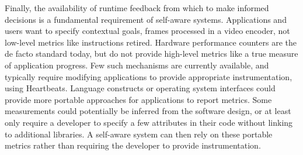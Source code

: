 Finally, the availability of runtime feedback from which to make informed decisions is a fundamental requirement of self-aware systems.
Applications and users want to specify contextual goals, \eg frames processed in a video encoder, not low-level metrics like instructions retired.
Hardware performance counters are the de facto standard today, but do not provide high-level metrics like a true measure of application progress.
Few such mechanisms are currently available, and typically require modifying applications to provide appropriate instrumentation, \eg using Heartbeats.
Language constructs or operating system interfaces could provide more portable approaches for applications to report metrics.
Some measurements could potentially be inferred from the software design, or at least only require a developer to specify a few attributes in their code without linking to additional libraries.
A self-aware system can then rely on these portable metrics rather than requiring the developer to provide instrumentation.
